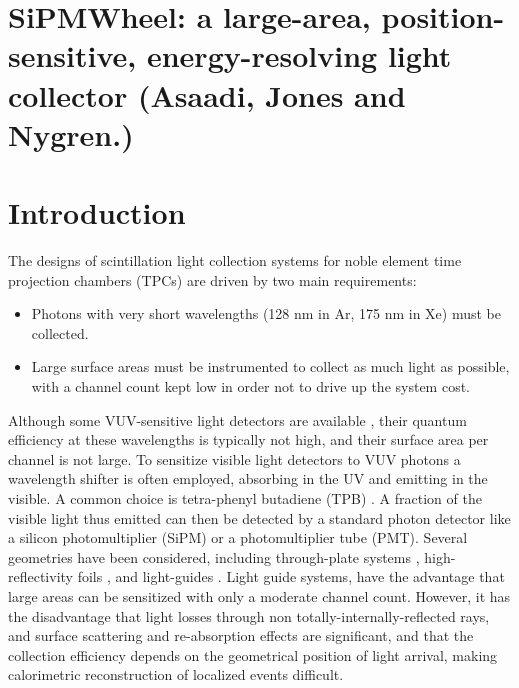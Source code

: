 
\section*{SiPMWheel: a large-area, position-sensitive, energy-resolving light collector (Asaadi, Jones and Nygren.)}

\section{Introduction}

The designs of scintillation light collection systems for noble element time projection chambers (TPCs) are driven by two main requirements:

\begin{itemize}
\item Photons with very short wavelengths (128 nm in Ar, 175 nm in Xe) must be collected.
\item Large surface areas must be instrumented to collect as much light as possible, with a channel count kept low in order not to drive up the system cost.
\end{itemize}

Although some VUV-sensitive light detectors are available \cite{Zabrodskii2015348,DeepUV}, their quantum efficiency at these wavelengths is typically not high, and their surface area per channel is not large.  To sensitize visible light detectors to VUV photons a wavelength shifter is often employed, absorbing in the UV and emitting in the visible.  A common choice is tetra-phenyl butadiene (TPB) \cite{Baptista:2013gna,Hanagodimath2008,Gehman:2013lsx,Gehman:2011xm,Burton1973,Jones:2012hm,Francini:2013Jinst}.  A fraction of the visible light thus emitted can then be detected by a standard photon detector like a silicon photomultiplier (SiPM) or a photomultiplier tube (PMT).  Several geometries have been considered, including through-plate systems \cite{Briese:2013wua,PostdocRevisited}, high-reflectivity foils \cite{Szelc:2013ooa,Kryczynski:2015pmj}, and light-guides \cite{Baptista:2012bf,Moss:2014ota,Mufson:2013zba}.  Light guide systems, have the advantage that large areas can be sensitized with only a moderate channel count.  However, it has the disadvantage that light losses through non totally-internally-reflected rays, and surface scattering and re-absorption effects \cite{Jones:2013sfa} are significant, and that the collection efficiency depends on the geometrical position of light arrival, making calorimetric reconstruction of localized events difficult.

